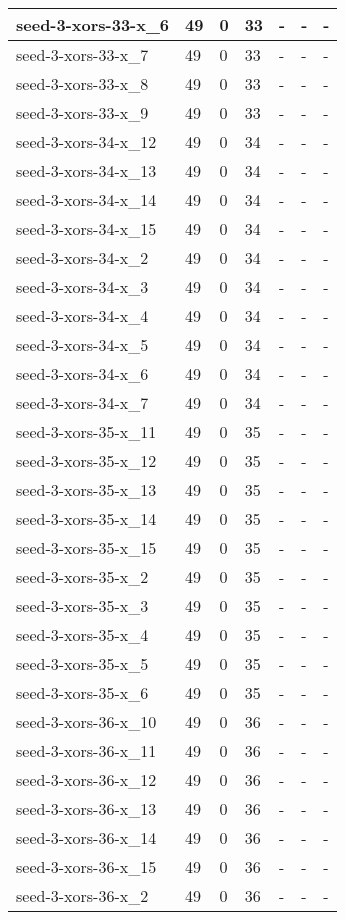 \begin{scriptsize}
\begin{longtable}{|p{5cm}|l|l|l|l|l|l|}
seed-3-xors-33-x\_6&49&0&33&-&-&- \\ \hline 
seed-3-xors-33-x\_7&49&0&33&-&-&- \\ \hline 
seed-3-xors-33-x\_8&49&0&33&-&-&- \\ \hline 
seed-3-xors-33-x\_9&49&0&33&-&-&- \\ \hline 
seed-3-xors-34-x\_12&49&0&34&-&-&- \\ \hline 
seed-3-xors-34-x\_13&49&0&34&-&-&- \\ \hline 
seed-3-xors-34-x\_14&49&0&34&-&-&- \\ \hline 
seed-3-xors-34-x\_15&49&0&34&-&-&- \\ \hline 
seed-3-xors-34-x\_2&49&0&34&-&-&- \\ \hline 
seed-3-xors-34-x\_3&49&0&34&-&-&- \\ \hline 
seed-3-xors-34-x\_4&49&0&34&-&-&- \\ \hline 
seed-3-xors-34-x\_5&49&0&34&-&-&- \\ \hline 
seed-3-xors-34-x\_6&49&0&34&-&-&- \\ \hline 
seed-3-xors-34-x\_7&49&0&34&-&-&- \\ \hline 
seed-3-xors-35-x\_11&49&0&35&-&-&- \\ \hline 
seed-3-xors-35-x\_12&49&0&35&-&-&- \\ \hline 
seed-3-xors-35-x\_13&49&0&35&-&-&- \\ \hline 
seed-3-xors-35-x\_14&49&0&35&-&-&- \\ \hline 
seed-3-xors-35-x\_15&49&0&35&-&-&- \\ \hline 
seed-3-xors-35-x\_2&49&0&35&-&-&- \\ \hline 
seed-3-xors-35-x\_3&49&0&35&-&-&- \\ \hline 
seed-3-xors-35-x\_4&49&0&35&-&-&- \\ \hline 
seed-3-xors-35-x\_5&49&0&35&-&-&- \\ \hline 
seed-3-xors-35-x\_6&49&0&35&-&-&- \\ \hline 
seed-3-xors-36-x\_10&49&0&36&-&-&- \\ \hline 
seed-3-xors-36-x\_11&49&0&36&-&-&- \\ \hline 
seed-3-xors-36-x\_12&49&0&36&-&-&- \\ \hline 
seed-3-xors-36-x\_13&49&0&36&-&-&- \\ \hline 
seed-3-xors-36-x\_14&49&0&36&-&-&- \\ \hline 
seed-3-xors-36-x\_15&49&0&36&-&-&- \\ \hline 
seed-3-xors-36-x\_2&49&0&36&-&-&- \\ \hline 

\end{longtable}
\end{scriptsize}
